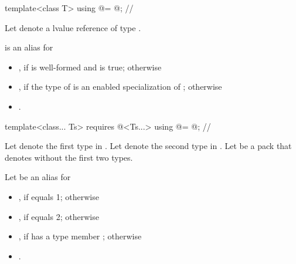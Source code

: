 \begin{itemdecl}
template<class T> using @\deducedsimd@ = @\seebelow@; // \expos
\end{itemdecl}
\begin{itemdescr}
  \pnum Let  denote a  lvalue reference of type .

  \pnum {} is an alias for
  \begin{itemize}
    \item {}, if  is well-formed and
       is true; otherwise

    \item {},
      if the type of  is an enabled specialization of ;
      otherwise

    \item {}.
  \end{itemize}
\end{itemdescr}

\begin{itemdecl}
template<class... Ts>
  requires @\mathfloatingpoint@<Ts...>
    using @\mathcommonsimd@ = @\seebelow@; // \expos
\end{itemdecl}
\begin{itemdescr}
  \pnum
  Let  denote the first type in .
  Let  denote the second type in .
  Let  be a pack that denotes  without the first two types.

  \pnum
  Let  be an alias for
  \begin{itemize}
    \item {}, if  equals 1; otherwise

    \item {}, if 
      equals 2; otherwise

    \item {}, if
       has a type member ;
      otherwise

    \item {}.
  \end{itemize}
\end{itemdescr}


